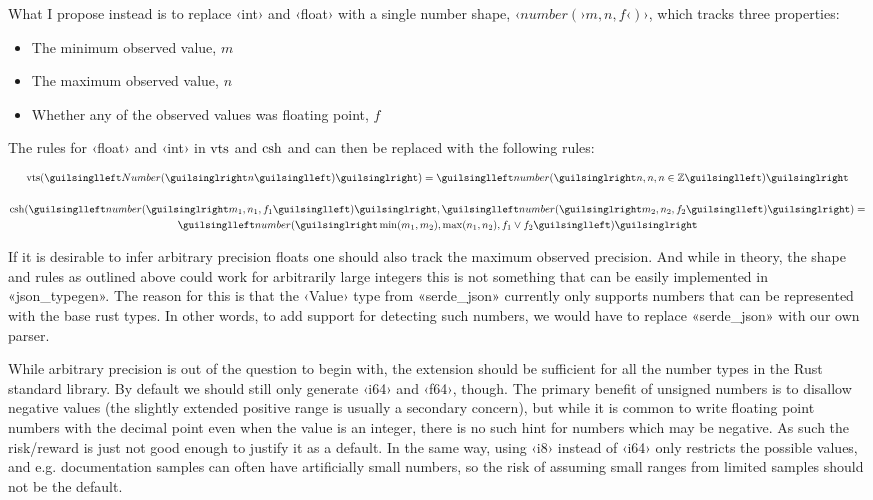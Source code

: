What I propose instead is to replace ‹int› and ‹float› with a single number shape, $‹number(› m, n, f ‹)›$, which tracks three properties:

\begin{itemize}
  \item The minimum observed value, $m$
  \item The maximum observed value, $n$
  \item Whether any of the observed values was floating point, $f$
\end{itemize}

The rules for ‹float› and ‹int› in $\operatorname{vts}$ and $\operatorname{csh}$ and can then be replaced with the following rules:

\begin{gather*}
\shap(‹Number(›n‹)›) = ‹number(› n, n, n \in \mathbb{Z} ‹)› \\
\\
\csh(‹number(› m_1, n_1, f_1 ‹)›, ‹number(› m_2, n_2, f_2 ‹)›) =\\ ‹number(› \min(m_1, m_2), \max(n_1, n_2), f_1 \lor f_2 ‹)›
\end{gather*}

If it is desirable to infer arbitrary precision floats one should also track the maximum observed precision. And while in theory, the shape and rules as outlined above could work for arbitrarily large integers this is not something that can be easily implemented in «json_typegen». The reason for this is that the ‹Value› type from «serde_json» currently only supports numbers that can be represented with the base rust types. In other words, to add support for detecting such numbers, we would have to replace «serde_json» with our own parser.

While arbitrary precision is out of the question to begin with, the extension should be sufficient for all the number types in the Rust standard library. By default we should still only generate ‹i64› and ‹f64›, though. The primary benefit of unsigned numbers is to disallow negative values (the slightly extended positive range is usually a secondary concern), but while it is common to write floating point numbers with the decimal point even when the value is an integer, there is no such hint for numbers which may be negative. As such the risk/reward is just not good enough to justify it as a default. In the same way, using ‹i8› instead of ‹i64› only restricts the possible values, and e.g. documentation samples can often have artificially small numbers, so the risk of assuming small ranges from limited samples should not be the default.

